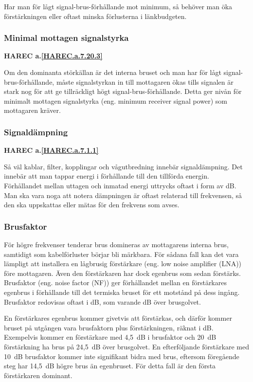 Har man för lågt signal-brus-förhållande mot minimum, så behöver man öka
förstärkningen eller oftast minska förlusterna i länkbudgeten.

\subsubsection{Minimal mottagen signalstyrka}
\textbf{HAREC a.\ref{HAREC.a.7.20.3}\label{myHAREC.a.7.20.3}}

Om den dominanta störkällan är det interna bruset och man har för lågt
signal-brus-förhållande, måste signalstyrkan in till mottagaren ökas
tills signalen är stark nog för att ge tillräckligt högt
signal-brus-förhållande.
Detta ger nivån för minimalt mottagen signalstyrka (eng. minimum receiver
signal power) som mottagaren kräver.

\subsubsection{Signaldämpning}
\textbf{HAREC a.\ref{HAREC.a.7.1.1}\label{myHAREC.a.7.1.1}}

Så väl kablar, filter, kopplingar och vågutbredning innebär signaldämpning.
Det innebär att man tappar energi i förhållande till den tillförda energin.
Förhållandet mellan uttagen och inmatad energi uttrycks oftast i form av dB.
Man ska vara noga att notera dämpningen är oftast relaterad till frekvensen,
så den ska uppskattas eller mätas för den frekvens som avses.

\subsubsection{Brusfaktor}
\label{brusfaktor}

För högre frekvenser tenderar brus domineras av mottagarens interna brus,
samtidigt som kabelförluster börjar bli märkbara.
För sådana fall kan det vara lämpligt att installera en lågbrusig förstärkare
(eng. low noise amplifier (LNA)) före mottagaren.
Även den förstärkaren har dock egenbrus som sedan förstärks.
Brusfaktor (eng. noise factor (NF)) ger förhållandet mellan en förstärkares
egenbrus i förhållande till det termiska bruset för ett motstånd på dess
ingång. Brusfaktor redovisas oftast i dB, som varande dB över brusgolvet.

En förstärkares egenbrus kommer givetvis att förstärkas, och därför kommer
bruset på utgången vara brusfaktorn plus förstärkningen, räknat i dB.
Exempelvis kommer en förstärkare med 4,5~dB i brusfaktor och 20~dB förstärkning
ha brus på 24,5~dB över brusgolvet.
En efterföljande förstärkare med 10~dB brusfaktor kommer inte signifikant
bidra med brus, eftersom föregående steg har 14,5~dB högre brus än egenbruset.
För detta fall är den första förstärkaren dominant.

